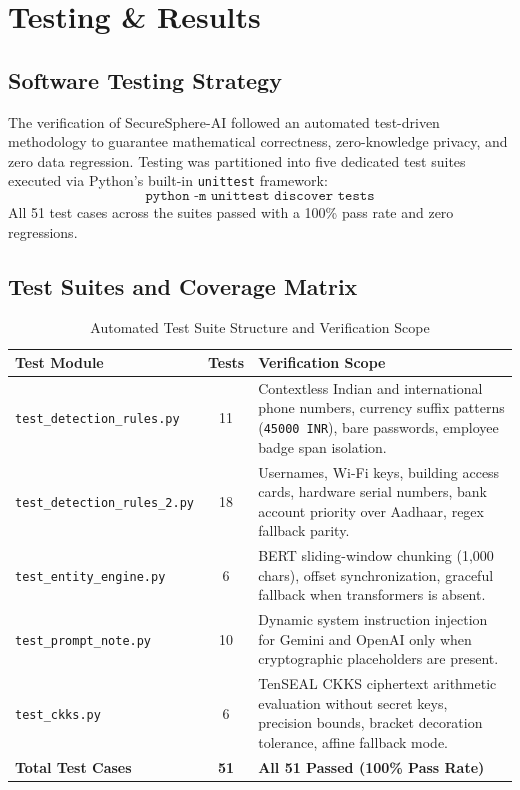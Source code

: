 \chapter{Testing \& Results}

\section{Software Testing Strategy}
The verification of SecureSphere-AI followed an automated test-driven methodology to guarantee mathematical correctness, zero-knowledge privacy, and zero data regression. Testing was partitioned into five dedicated test suites executed via Python's built-in \texttt{unittest} framework:
\begin{equation}
\texttt{python -m unittest discover tests}
\end{equation}
All 51 test cases across the suites passed with a 100\% pass rate and zero regressions.

\section{Test Suites and Coverage Matrix}

\begin{table}[htbp]
\centering
\caption{Automated Test Suite Structure and Verification Scope}\label{tab:test_suites}
\begin{tabular}{p{}cp{}}
\toprule
\textbf{Test Module} & \textbf{Tests} & \textbf{Verification Scope} \\
\midrule
\texttt{test\_detection\_rules.py} & 11 & Contextless Indian and international phone numbers, currency suffix patterns (\texttt{45000 INR}), bare passwords, employee badge span isolation. \\
\texttt{test\_detection\_rules\_2.py} & 18 & Usernames, Wi-Fi keys, building access cards, hardware serial numbers, bank account priority over Aadhaar, regex fallback parity. \\
\texttt{test\_entity\_engine.py} & 6 & BERT sliding-window chunking (1,000 chars), offset synchronization, graceful fallback when transformers is absent. \\
\texttt{test\_prompt\_note.py} & 10 & Dynamic system instruction injection for Gemini and OpenAI only when cryptographic placeholders are present. \\
\texttt{test\_ckks.py} & 6 & TenSEAL CKKS ciphertext arithmetic evaluation without secret keys, precision bounds, bracket decoration tolerance, affine fallback mode. \\
\midrule
\textbf{Total Test Cases} & \textbf{51} & \textbf{All 51 Passed (100\% Pass Rate)} \\
\bottomrule
\end{tabular}
\end{table}


